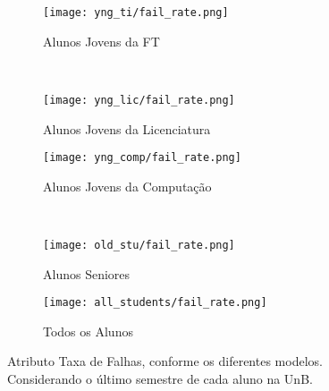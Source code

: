 \clearpage
\begin{figure}[!ht]
    \centering
    \begin{subfigure}[b]{0.48\textwidth}
        \centering
        \texttt{[image: yng\_ti/fail\_rate.png]}
        \caption{Alunos Jovens da FT}
    \end{subfigure}
    ~
    \begin{subfigure}[b]{0.48\textwidth}
        \centering
        \texttt{[image: yng\_lic/fail\_rate.png]}
        \caption{Alunos Jovens da Licenciatura}
    \end{subfigure}

    \begin{subfigure}[b]{0.48\textwidth}
        \centering
        \texttt{[image: yng\_comp/fail\_rate.png]}
        \caption{Alunos Jovens da Computação}
    \end{subfigure}
    ~
    \begin{subfigure}[b]{0.48\textwidth}
        \centering
        \texttt{[image: old\_stu/fail\_rate.png]}
        \caption{Alunos Seniores}
    \end{subfigure}

    \begin{subfigure}[b]{0.48\textwidth}
        \centering
        \texttt{[image: all\_students/fail\_rate.png]}
        \caption{Todos os Alunos}
    \end{subfigure}
    \caption{Atributo Taxa de Falhas, conforme os diferentes modelos. Considerando o
    último semestre de cada aluno na UnB.}
\end{figure}

